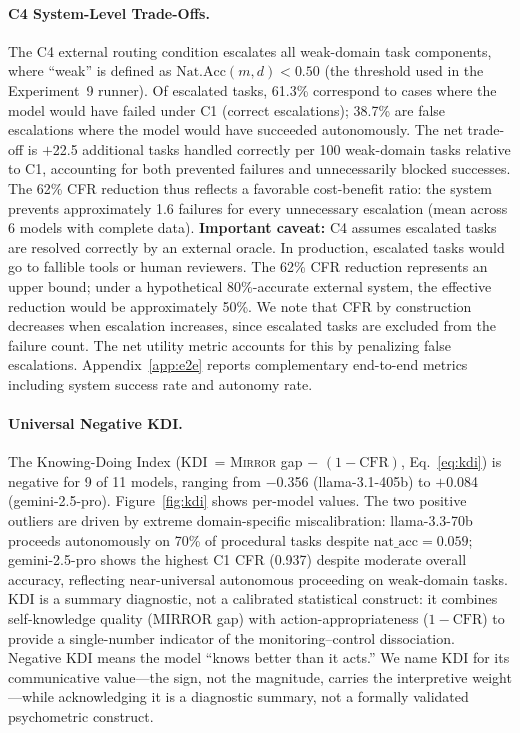 \documentclass[10pt]{article}
\newcommand{\mirror}{\textsc{Mirror}}
\newcommand{\KDI}{KDI}
\newcommand{\CFR}{CFR}
\begin{document}
\paragraph{C4 System-Level Trade-Offs.}
The C4 external routing condition escalates all weak-domain task components,
where ``weak'' is defined as $\text{Nat.Acc}(m,d) < 0.50$ (the threshold used in
the Experiment~9 runner). Of escalated tasks,
61.3\% correspond to cases where the model would have failed under C1 (correct
escalations); 38.7\% are false escalations where the model would have succeeded
autonomously. The net trade-off is $+$22.5 additional tasks handled correctly per
100 weak-domain tasks relative to C1, accounting for both prevented failures and
unnecessarily blocked successes. The 62\% CFR reduction thus reflects a favorable
cost-benefit ratio: the system prevents approximately 1.6 failures for every
unnecessary escalation (mean across 6 models with complete data).
\textbf{Important caveat:} C4 assumes escalated tasks are resolved correctly by an
external oracle. In production, escalated tasks would go to fallible tools or
human reviewers. The 62\% CFR reduction represents an upper bound; under a
hypothetical 80\%-accurate external system, the effective reduction would be
approximately 50\%.
We note that CFR by construction decreases when escalation increases, since
escalated tasks are excluded from the failure count. The net utility metric
accounts for this by penalizing false escalations. Appendix~\ref{app:e2e}
reports complementary end-to-end metrics including system success rate and
autonomy rate.

\paragraph{Universal Negative \KDI{}.}
The Knowing-Doing Index (\KDI{}~= \mirror{} gap $-$ $(1 - \text{CFR})$,
Eq.~\ref{eq:kdi}) is negative for 9 of 11 models, ranging from $-$0.356 (llama-3.1-405b) to
$+$0.084 (gemini-2.5-pro). Figure~\ref{fig:kdi} shows per-model values. The two
positive outliers are driven by extreme domain-specific miscalibration:
llama-3.3-70b proceeds autonomously on 70\% of procedural tasks despite
$\text{nat\_acc} = 0.059$; gemini-2.5-pro shows the highest C1 \CFR{} (0.937)
despite moderate overall accuracy, reflecting near-universal autonomous
proceeding on weak-domain tasks.
KDI is a summary diagnostic, not a calibrated statistical construct: it combines
self-knowledge quality (MIRROR gap) with action-appropriateness ($1 - \text{CFR}$)
to provide a single-number indicator of the monitoring--control dissociation.
Negative KDI means the model ``knows better than it acts.'' We name KDI for its
communicative value---the sign, not the magnitude, carries the interpretive
weight---while acknowledging it is a diagnostic summary, not a formally validated
psychometric construct.
\end{document}
